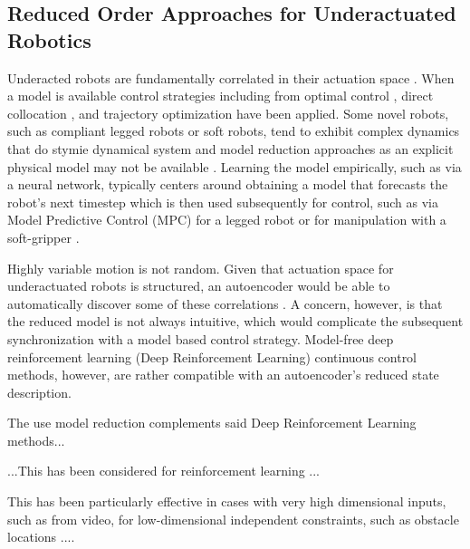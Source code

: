 \documentclass[letterpaper, 10 pt, conference]{ieeeconf}
\begin{document}


\subsection{Reduced Order Approaches for Underactuated Robotics}

Underacted robots are fundamentally correlated in their actuation space  \cite{tedrake2009underactuated}.
When a model is available control strategies including from optimal control \cite{betts2010practical}, direct collocation \cite{von1993numerical}, and trajectory optimization \cite{kalakrishnan2011stomp} have been applied.
Some novel robots, such as compliant legged robots or soft robots, tend to exhibit complex dynamics that do stymie dynamical system and model reduction approaches as an explicit physical model may not be available \cite{nakajima2015information}.
Learning the model empirically, such as via a neural network, typically centers around obtaining a model that forecasts the robot's next timestep which is then used subsequently for control, such as via Model Predictive Control (MPC)  for a legged robot \cite{nagabandi2018learning} or for manipulation with a soft-gripper \cite{nishimura2017thin}.

Highly variable motion is not random.
Given that actuation space for underactuated robots is structured, an autoencoder would be able to automatically discover some of these correlations \cite{AE_hinton2006reducing, ngsparse}.
A concern, however, is that the reduced model is not always intuitive, which would complicate the subsequent synchronization with a model based control strategy.
Model-free deep reinforcement learning (Deep Reinforcement Learning) continuous control methods, however, are rather compatible with an autoencoder's reduced state description.

The use model reduction complements said Deep Reinforcement Learning methods...

...This has been considered for reinforcement learning ... 

This has been particularly effective in cases with very high dimensional inputs, such as from video, for low-dimensional independent constraints, such as obstacle locations \cite{finn2016deep, lynch2019learning}....
\end{document}
